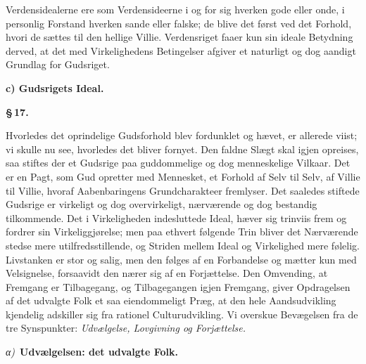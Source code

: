 \documentclass[12pt]{book}
\newcommand{\parmark}[1]{\begin{center}{\bfseries \S\,#1.}\end{center}}
\newcommand{\runhead}[1]{%
  \medskip\begin{center}{\bfseries #1}\end{center}\medskip}
\newcommand{\greekrun}[2]{%
  \medskip\begin{center}{\itshape #1)}\ {\bfseries #2}\end{center}\medskip}
\begin{document}
Verdensidealerne ere som Verdensideerne i og for sig hverken gode
eller onde, i personlig Forstand hverken sande eller falske; de
blive det først ved det Forhold, hvori de sættes til den hellige
Villie. Verdensriget faaer kun sin ideale Betydning derved, at det
med Virkelighedens Betingelser afgiver et naturligt og dog aandigt
Grundlag for Gudsriget.
\runhead{c) Gudsrigets Ideal.}
\parmark{17}

Hvorledes det oprindelige Gudsforhold blev fordunklet og hævet, er
allerede viist; vi skulle nu see, hvorledes det bliver fornyet. Den
faldne Slægt skal igjen opreises, saa stiftes der et Gudsrige paa
guddommelige og dog menneskelige Vilkaar. Det er en Pagt, som Gud
opretter med Mennesket, et Forhold af Selv til Selv, af Villie til
Villie, hvoraf Aabenbaringens Grundcharakteer fremlyser. Det
saaledes stiftede Gudsrige er virkeligt og dog overvirkeligt,
nærværende og dog bestandig tilkommende. Det i Virkeligheden
indesluttede Ideal, hæver sig trinviis frem og fordrer sin
Virkeliggjørelse; men paa ethvert følgende Trin bliver det
Nærværende stedse mere utilfredsstillende, og Striden mellem Ideal
og Virkelighed mere følelig. Livstanken er stor og salig, men den
følges af en Forbandelse og mætter kun med Velsignelse, forsaavidt
den nærer sig af en Forjættelse. Den Omvending, at Fremgang er
Tilbagegang, og Tilbagegangen igjen Fremgang, giver Opdragelsen af
det udvalgte Folk et saa eiendommeligt Præg, at den hele
Aandsudvikling kjendelig adskiller sig fra rationel Culturudvikling.
Vi overskue Bevægelsen fra de tre Synspunkter: \emph{Udvælgelse,
Lovgivning og Forjættelse.}

\greekrun{α}{Udvælgelsen: det udvalgte Folk.}
\end{document}
